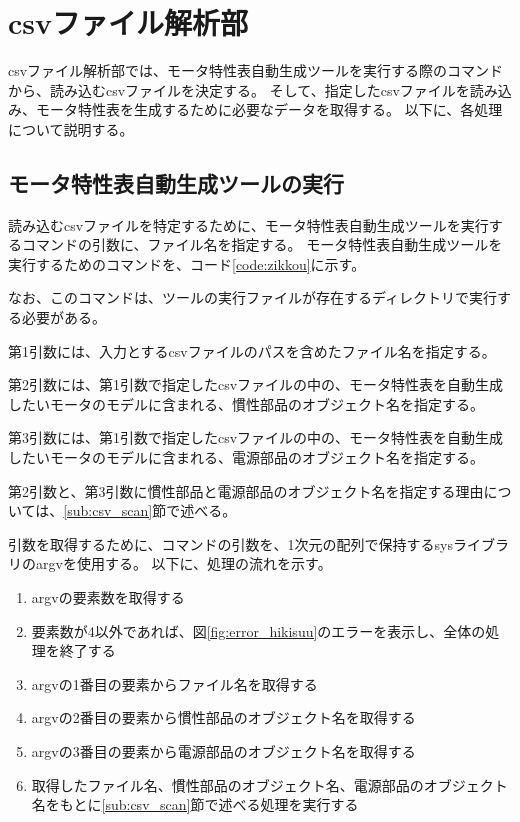 \section{csvファイル解析部}\label{csv_sec}
csvファイル解析部では、モータ特性表自動生成ツールを実行する際のコマンドから、読み込むcsvファイルを決定する。
そして、指定したcsvファイルを読み込み、モータ特性表を生成するために必要なデータを取得する。
以下に、各処理について説明する。
\subsection{モータ特性表自動生成ツールの実行}\label{sub:zikkou_tool}
読み込むcsvファイルを特定するために、モータ特性表自動生成ツールを実行するコマンドの引数に、ファイル名を指定する。
モータ特性表自動生成ツールを実行するためのコマンドを、コード\ref{code:zikkou}に示す。
\begin{figure}[t]
	
\end{figure}
なお、このコマンドは、ツールの実行ファイルが存在するディレクトリで実行する必要がある。

第1引数には、入力とするcsvファイルのパスを含めたファイル名を指定する。

第2引数には、第1引数で指定したcsvファイルの中の、モータ特性表を自動生成したいモータのモデルに含まれる、慣性部品のオブジェクト名を指定する。

第3引数には、第1引数で指定したcsvファイルの中の、モータ特性表を自動生成したいモータのモデルに含まれる、電源部品のオブジェクト名を指定する。

第2引数と、第3引数に慣性部品と電源部品のオブジェクト名を指定する理由については、\ref{sub:csv_scan}節で述べる。

引数を取得するために、コマンドの引数を、1次元の配列で保持するsysライブラリのargvを使用する。
以下に、処理の流れを示す。

\begin{enumerate}
    \item argvの要素数を取得する
    \item 要素数が4以外であれば、図\ref{fig:error_hikisuu}のエラーを表示し、全体の処理を終了する
    \item argvの1番目の要素からファイル名を取得する
    \item argvの2番目の要素から慣性部品のオブジェクト名を取得する
    \item argvの3番目の要素から電源部品のオブジェクト名を取得する
    \item 取得したファイル名、慣性部品のオブジェクト名、電源部品のオブジェクト名をもとに\ref{sub:csv_scan}節で述べる処理を実行する
\end{enumerate}

